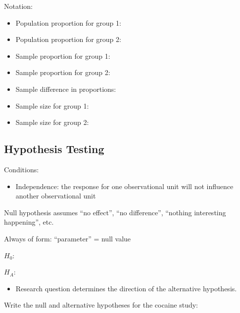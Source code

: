\documentclass[
]{report}
\providecommand{\tightlist}{%
  \setlength{\itemsep}{0pt}\setlength{\parskip}{0pt}}
\newcommand{\rgi}{\hspace{24pt}}  %
\begin{document}
\vspace{0.15in}


Notation:

\begin{itemize}
\item
  Population proportion for group 1:
\item
  Population proportion for group 2:
\item
  Sample proportion for group 1:
\item
  Sample proportion for group 2:
\item
  Sample difference in proportions:
\item
  Sample size for group 1:
\item
  Sample size for group 2:
\end{itemize}


\subsection*{Hypothesis Testing}\label{hypothesis-testing}

Conditions:

\begin{itemize}
\tightlist
\item
  Independence: the response for one observational unit will not influence another observational unit
\end{itemize}

Null hypothesis assumes ``no effect'', ``no difference'', ``nothing interesting happening'', etc.

\rgi Always of form: ``parameter'' = null value

\(H_0:\)

\vspace{0.2in}

\(H_A:\)

\vspace{0.2in}

\begin{itemize}
\tightlist
\item
  Research question determines the direction of the alternative hypothesis.
\end{itemize}

\newpage

Write the null and alternative hypotheses for the cocaine study:
\end{document}
